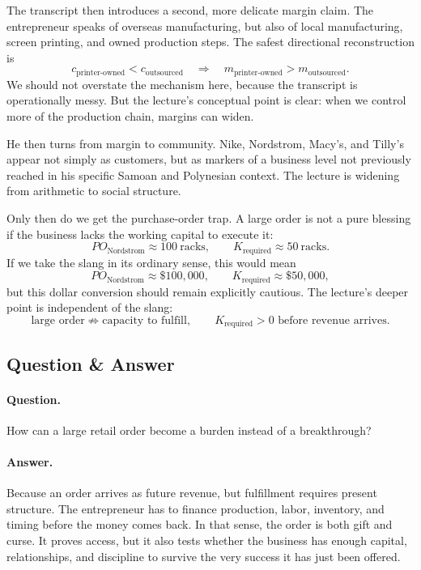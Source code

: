 The transcript then introduces a second, more delicate margin claim. The entrepreneur speaks of overseas manufacturing, but also of local manufacturing, screen printing, and owned production steps. The safest directional reconstruction is
\begin{equation}
c_{\text{printer-owned}} < c_{\text{outsourced}}
\quad \Rightarrow \quad
m_{\text{printer-owned}} > m_{\text{outsourced}}.
\end{equation}
We should not overstate the mechanism here, because the transcript is operationally messy. But the lecture's conceptual point is clear: when we control more of the production chain, margins can widen.

He then turns from margin to community. Nike, Nordstrom, Macy's, and Tilly's appear not simply as customers, but as markers of a business level not previously reached in his specific Samoan and Polynesian context. The lecture is widening from arithmetic to social structure.

Only then do we get the purchase-order trap. A large order is not a pure blessing if the business lacks the working capital to execute it:
\begin{equation}
PO_{\text{Nordstrom}} \approx 100\ \text{racks},\qquad
K_{\text{required}} \approx 50\ \text{racks}.
\end{equation}
If we take the slang in its ordinary sense, this would mean
\begin{equation}
PO_{\text{Nordstrom}} \approx \$100{,}000,\qquad
K_{\text{required}} \approx \$50{,}000,
\end{equation}
but this dollar conversion should remain explicitly cautious. The lecture's deeper point is independent of the slang:
\begin{equation}
\text{large order} \not\Rightarrow \text{capacity to fulfill},\qquad
K_{\text{required}} > 0 \text{ before revenue arrives}.
\end{equation}

\subsection{Question \& Answer}

\paragraph{Question.} How can a large retail order become a burden instead of a breakthrough?

\paragraph{Answer.} Because an order arrives as future revenue, but fulfillment requires present structure. The entrepreneur has to finance production, labor, inventory, and timing before the money comes back. In that sense, the order is both gift and curse. It proves access, but it also tests whether the business has enough capital, relationships, and discipline to survive the very success it has just been offered.

